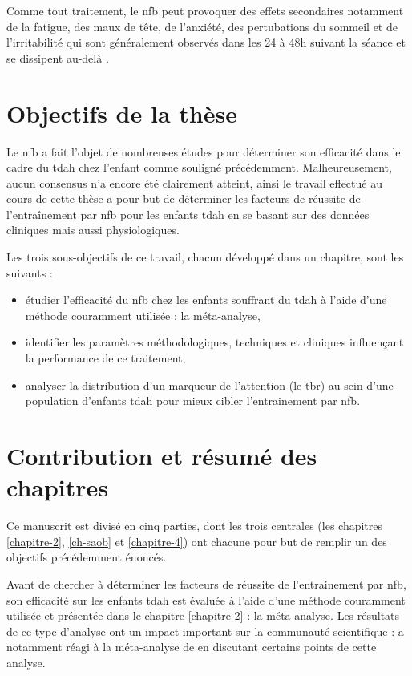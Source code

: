 Comme tout traitement, le \gls{nfb} peut provoquer des effets secondaires notamment de la fatigue, des maux de tête, de l'anxiété, des pertubations du sommeil et de l'irritabilité qui
sont généralement observés dans les 24 à 48h suivant la séance et se dissipent au-delà \citep{Hammond2007}. 


\section{Objectifs de la thèse}

Le \gls{nfb} a fait l'objet de nombreuses études pour déterminer son efficacité dans le cadre du \gls{tdah} chez l'enfant comme souligné précédemment.
Malheureusement, aucun consensus n'a encore été clairement atteint, ainsi le travail effectué au cours de cette thèse a pour but de déterminer les facteurs 
de réussite de l'entraînement par \gls{nfb} pour les enfants \gls{tdah} en se basant sur des données cliniques mais aussi physiologiques. 

Les trois sous-objectifs de ce travail, chacun développé dans un chapitre, sont les suivants :
\begin{itemize}
\item étudier l'efficacité du \gls{nfb} chez les enfants souffrant du \gls{tdah} à l'aide d'une méthode couramment utilisée : la méta-analyse,
\item identifier les paramètres méthodologiques, techniques et cliniques influençant la performance de ce traitement,
\item analyser la distribution d'un marqueur de l'attention (le \gls{tbr}) au sein d'une population d'enfants \gls{tdah} pour mieux cibler
l'entrainement par \gls{nfb}. 
\end{itemize}

\section{Contribution et résumé des chapitres}

Ce manuscrit est divisé en cinq parties, dont les trois centrales (les chapitres \ref{chapitre-2}, \ref{ch-saob} et \ref{chapitre-4}) 
ont chacune pour but de remplir un des objectifs précédemment énoncés.

Avant de chercher à déterminer les facteurs de réussite de l'entrainement par \gls{nfb}, son efficacité sur les enfants \gls{tdah} est évaluée à l'aide 
d'une méthode couramment utilisée \citep{Sonuga-Barke2013, Micoulaud2014, Cortese2016} et présentée dans le chapitre \ref{chapitre-2} : la méta-analyse. 
Les résultats de ce type d'analyse ont un impact important sur la communauté scientifique : \citet{Micoulaud2016} a notamment réagi à la méta-analyse de 
\citet{Cortese2016} en discutant certains points de cette analyse. 

